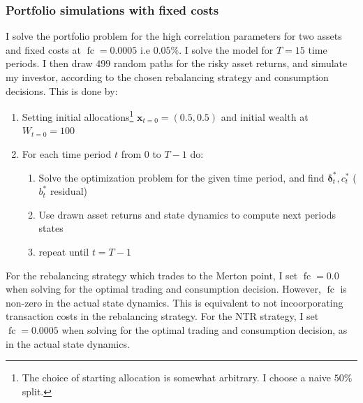 \documentclass[11pt]{article}
\begin{document}
\subsubsection{Portfolio simulations with fixed costs}  \label{Subsubsection: Portfolio_Simulations_Proportional}
I solve the portfolio problem for the high correlation parameters for two assets and fixed costs at $\operatorname{fc} = 0.0005$ i.e $0.05\%$.
I solve the model for $T = 15$ time periods. I then draw $499$ random paths for the risky asset returns, and
simulate my investor, according to the chosen rebalancing strategy and consumption decisions. This is done by:
\begin{enumerate}
    \item Setting initial allocations\footnote{The choice of starting allocation is somewhat arbitrary. I choose a naive $50$\% split.} $\mathbf{x}_{t=0} = (0.5 , 0.5)$ and initial wealth at $W_{t=0} = 100$
    \item For each time period $t$ from $0$ to $T-1$ do:
    \begin{enumerate}
        \item Solve the optimization problem for the given time period, and find $\boldsymbol{\delta}^{*}_{t}, c^{*}_{t}$ ($b^{*}_t$ residual)
        \item Use drawn asset returns and state dynamics to compute next periods states
        \item repeat until $t = T-1$
    \end{enumerate}
\end{enumerate}
For the rebalancing strategy which trades to the Merton point, I set $\operatorname{fc} = 0.0$ when solving for the optimal trading and consumption decision.
However, $\operatorname{fc}$ is non-zero in the actual state dynamics. This is equivalent to not incoorporating transaction costs in the rebalancing strategy.
For the \ac{NTR} strategy, I set $\operatorname{fc} = 0.0005$ when solving for the optimal trading and consumption decision, as in the actual state dynamics.
\end{document}
